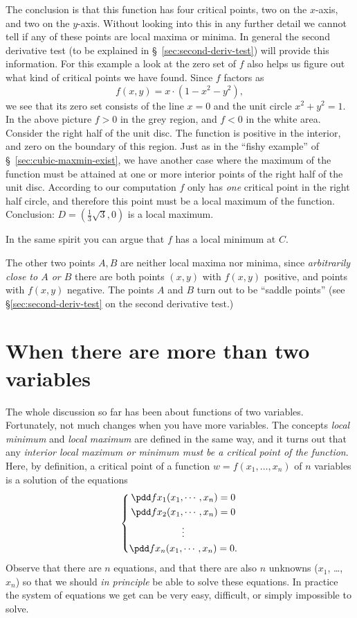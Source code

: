 The conclusion is that this function has four critical points, two on the
$x$-axis, and two on the $y$-axis.  Without looking into this in any further
detail we cannot tell if any of these points are local maxima or minima.  In
general the second derivative test (to be explained in
\S~\ref{sec:second-deriv-test}) will provide this information.  For this example
a look at the zero set of $f$ also helps us figure out what kind of critical
points we have found.  Since $f$ factors as
\[
f(x, y) = x\cdot (1-x^2-y^2),
\]
we see that its zero set consists of the line $x=0$ and the unit circle
$x^2+y^2=1$.  In the above picture $f>0$ in the grey region, and $f<0$ in the
white area.  Consider the right half of the unit disc.  The function is positive
in the interior, and zero on the boundary of this region.  Just as in the
``fishy example'' of \S~\ref{sec:cubic-maxmin-exist}, we have another case where
the maximum of the function must be attained at one or more interior points of
the right half of the unit disc.  According to our computation $f$ only has
\textit{one} critical point in the right half circle, and therefore this point
must be a local maximum of the function.  Conclusion: $D=(\frac13\sqrt3,0)$ is a
local maximum.

In the same spirit you can argue that $f$ has a local minimum at $C$.

The other two points $A,B$ are neither local maxima nor minima, since
\textit{arbitrarily close to $A$ or $B$} there are both points $(x,y)$ with
$f(x,y)$ positive, and points with $f(x,y)$ negative.  The points $A$ and $B$
turn out to be ``saddle points'' (see \S\ref{sec:second-deriv-test} on the
second derivative test.)

\section{When there are more than two variables}
The whole discussion so far has been about functions of two variables.
Fortunately, not much changes when you have more variables.  The concepts
\textit{local minimum} and \textit{local maximum} are defined in the same way,
and it turns out that any \textit{interior local maximum or minimum must be a
  critical point of the function}.  Here, by definition, a critical point of a
function $w=f(x_1, \ldots, x_n)$ of $n$ variables is a solution of the equations
\[
\left\{
  \begin{gathered}
    \pdd f{x_1} (x_1, \cdots, x_n) =0\\
    \pdd f{x_2} (x_1, \cdots, x_n) =0\\
    \vdots\\
    \pdd f{x_n} (x_1, \cdots, x_n) =0.
  \end{gathered}
\right.
\]
Observe that there are $n$ equations, and that there are also $n$ unknowns
($x_1$, \ldots, $x_n$) so that we should \textit{in principle} be able to solve
these equations.  In practice the system of equations we get can be very easy,
difficult, or simply impossible to solve.

